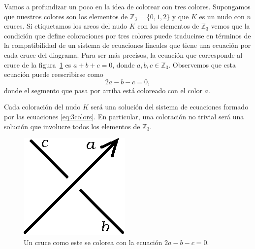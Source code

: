 \documentclass[graybox]{svmult}
\newcommand{\Z}{\mathbb{Z}}
\begin{document}
Vamos a profundizar un poco en la idea de colorear con tres colores.
Supongamos que nuestros colores son los elementos de $\Z_3=\{0,1,2\}$ y que
$K$ es un nudo con $n$ cruces. Si etiquetamos los arcos del nudo $K$ con
los elementos de $\Z_3$ vemos que la condición que define coloraciones por
tres colores puede traducirse en términos de la compatibilidad de un
sistema de ecuaciones lineales que tiene una ecuación por cada cruce del
diagrama.  Para ser más precisos, la ecuación que corresponde al cruce de
la figura~\ref{fig:crossing} es $a+b+c=0$, donde $a,b,c\in\Z_3$.
Observemos que esta ecuación puede reescribirse como 
\begin{equation} 
	\label{eq:3colors}
	2a-b-c=0,
\end{equation}
donde el segmento que pasa por arriba está coloreado con el color $a$. 

Cada coloración del nudo $K$ será una solución del sistema de ecuaciones
formado por las ecuaciones \eqref{eq:3colors}. En particular, una
coloración no trivial será una solución que involucre todos los elementos
de $\Z_3$. 

\begin{figure}[ht]
	\centering
	\includegraphics[scale=0.6]{images/crossing}
	\caption{Un cruce como este se colorea con la ecuación $2a-b-c=0$.}
	\label{fig:crossing}
\end{figure}
\end{document}
